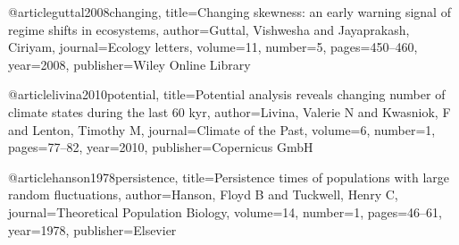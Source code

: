@article{guttal2008changing,
  title={Changing skewness: an early warning signal of regime shifts in ecosystems},
  author={Guttal, Vishwesha and Jayaprakash, Ciriyam},
  journal={Ecology letters},
  volume={11},
  number={5},
  pages={450--460},
  year={2008},
  publisher={Wiley Online Library}
}

@article{livina2010potential,
  title={Potential analysis reveals changing number of climate states during the last 60 kyr},
  author={Livina, Valerie N and Kwasniok, F and Lenton, Timothy M},
  journal={Climate of the Past},
  volume={6},
  number={1},
  pages={77--82},
  year={2010},
  publisher={Copernicus GmbH}
}

@article{hanson1978persistence,
  title={Persistence times of populations with large random fluctuations},
  author={Hanson, Floyd B and Tuckwell, Henry C},
  journal={Theoretical Population Biology},
  volume={14},
  number={1},
  pages={46--61},
  year={1978},
  publisher={Elsevier}
}